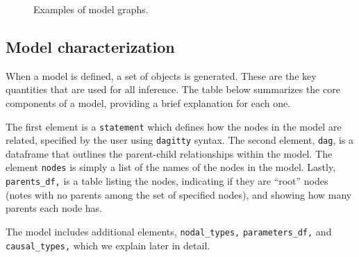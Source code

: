 \documentclass[
  11pt,
  article]{jss}
\begin{document}
\begin{figure}

\begin{minipage}[t]{0.50\linewidth}

{\centering 


}

\end{minipage}%
%
\begin{minipage}[t]{0.50\linewidth}

{\centering 


}

\end{minipage}%

\caption{\label{fig-plots}Examples of model graphs.}

\end{figure}

\hypertarget{model-characterization}{%
\subsection{Model characterization}\label{model-characterization}}

When a model is defined, a set of objects is generated. These are the
key quantities that are used for all inference. The table below
summarizes the core components of a model, providing a brief explanation
for each one.

The first element is a \texttt{statement} which defines how the nodes in
the model are related, specified by the user using \texttt{dagitty}
syntax. The second element, \texttt{dag}, is a dataframe that outlines
the parent-child relationships within the model. The element
\texttt{nodes} is simply a list of the names of the nodes in the model.
Lastly, \texttt{parents\_df,} is a table listing the nodes, indicating
if they are ``root'' nodes (notes with no parents among the set of
specified nodes), and showing how many parents each node has.

The model includes additional elements, \texttt{nodal\_types,}
\texttt{parameters\_df,} and \texttt{causal\_types,} which we explain
later in detail.
\end{document}
